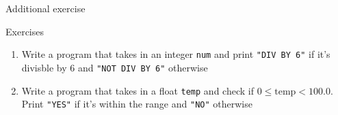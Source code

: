 \documentclass[10pt,xcolor={table,dvipsnames},t]{beamer}
\begin{document}
\begin{frame}{Additional exercise}
  \begin{exampleblock}{Exercises}
    \begin{enumerate}
      \item Write a program that takes in an integer \texttt{num} and print \texttt{"DIV BY 6"} if it's divisble by 6 and \texttt{"NOT DIV BY 6"} otherwise
      \item Write a program that takes in a float \texttt{temp} and check if $0\leq \text{temp} < 100.0 $. Print \texttt{"YES"} if it's within the range and \texttt{"NO"} otherwise 
    \end{enumerate}
  \end{exampleblock}
\end{frame}
\end{document}
